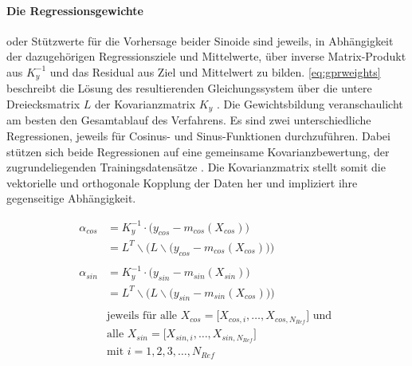 \paragraph*{Die Regressionsgewichte} oder Stützwerte für die Vorhersage beider Sinoide sind jeweils, in Abhängigkeit der dazugehörigen Regressionsziele und Mittelwerte, über inverse Matrix-Produkt aus $K_y^{-1}$ und das Residual aus Ziel und Mittelwert zu bilden. \autoref{eq:gprweights} beschreibt die Lösung des resultierenden Gleichungssystem über die untere Dreiecksmatrix $L$ der Kovarianzmatrix $K_y$ \cite{Rasmussen2006}. Die Gewichtsbildung veranschaulicht am besten den Gesamtablauf des Verfahrens. Es sind zwei unterschiedliche Regressionen, jeweils für Cosinus- und Sinus-Funktionen durchzuführen. Dabei stützen sich beide Regressionen auf eine gemeinsame Kovarianzbewertung, der zugrundeliegenden Trainingsdatensätze \cite{Schuethe2020}. Die Kovarianzmatrix stellt somit die vektorielle und orthogonale Kopplung der Daten her und impliziert ihre gegenseitige Abhängigkeit.


\begin{align}\label{eq:gprweights}
	\alpha_{cos} &= K_y^{-1} \cdot \big( y_{cos} - m_{cos}(X_{cos}) \big) \nonumber \\
				 &= L^T \backslash \Big(L \backslash \big( y_{cos} - m_{cos}(X_{cos}) \big) \Big) \nonumber \\
	\\
	\alpha_{sin} &= K_y^{-1} \cdot \big( y_{sin} - m_{sin}(X_{sin}) \big) \nonumber \\
				 &= L^T \backslash \Big(L \backslash \big( y_{sin} - m_{sin}(X_{cos}) \big) \Big) \nonumber \\
	\nonumber \\
& \text{jeweils für alle } X_{cos} = \big[ X_{cos,i},\dots, X_{cos,N_{Ref}} \big] \text{ und } \nonumber \\
& \text{alle } X_{sin} = \big[ X_{sin,i},\dots, X_{sin,N_{Ref}} \big] \nonumber \\
& \text{mit } i = 1,2,3,\ldots,N_{Ref} \nonumber
\end{align}


\clearpage


